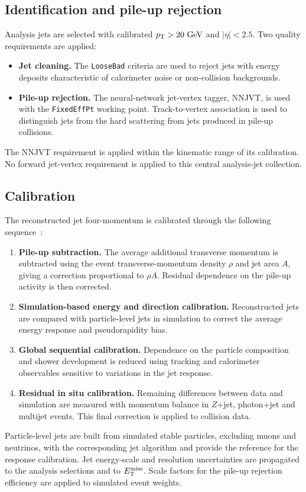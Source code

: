 \subsection{Identification and pile-up rejection}

Analysis jets are selected with calibrated $p_{\mathrm{T}}>20~\mathrm{GeV}$ and $|\eta|<2.5$.
Two quality requirements are applied:
\begin{itemize}
    \item \textbf{Jet cleaning.} The \texttt{LooseBad} criteria are used to reject jets with energy deposits characteristic of calorimeter noise or non-collision backgrounds.
    \item \textbf{Pile-up rejection.} The neural-network jet-vertex tagger, NNJVT, is used with the \texttt{FixedEffPt} working point. Track-to-vertex association is used to distinguish jets from the hard scattering from jets produced in pile-up collisions.
\end{itemize}
The NNJVT requirement is applied within the kinematic range of its calibration.
No forward jet-vertex requirement is applied to this central analysis-jet collection.

\subsection{Calibration}

The reconstructed jet four-momentum is calibrated through the following sequence~\cite{ATLAS2021JetCalibration}:
\begin{enumerate}
    \item \textbf{Pile-up subtraction.} The average additional transverse momentum is subtracted using the event transverse-momentum density $\rho$ and jet area $A$, giving a correction proportional to $\rho A$. Residual dependence on the pile-up activity is then corrected.
    \item \textbf{Simulation-based energy and direction calibration.} Reconstructed jets are compared with particle-level jets in simulation to correct the average energy response and pseudorapidity bias.
    \item \textbf{Global sequential calibration.} Dependence on the particle composition and shower development is reduced using tracking and calorimeter observables sensitive to variations in the jet response.
    \item \textbf{Residual in situ calibration.} Remaining differences between data and simulation are measured with momentum balance in $Z$+jet, photon+jet and multijet events. This final correction is applied to collision data.
\end{enumerate}
Particle-level jets are built from simulated stable particles, excluding muons and neutrinos, with the corresponding jet algorithm and provide the reference for the response calibration.
Jet energy-scale and resolution uncertainties are propagated to the analysis selections and to $E_{\mathrm{T}}^{\mathrm{miss}}$.
Scale factors for the pile-up rejection efficiency are applied to simulated event weights.
